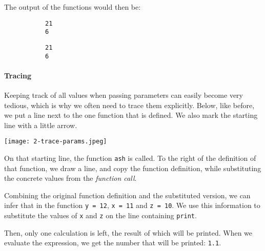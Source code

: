 The output of the functions would then be:

\begin{figure}[h]
\begin{subfigure}[b]{.5\linewidth}
\begin{verbatim}
21
6
\end{verbatim}
\end{subfigure}
\begin{subfigure}[b]{.5\linewidth}
\begin{verbatim}
21
6
\end{verbatim}
\end{subfigure}
\end{figure}

\paragraph{Tracing}

Keeping track of all values when passing parameters can easily become very tedious, which is why we often need to trace them explicitly. Below, like before, we put a line next to the one function that is defined. We also mark the starting line with a little arrow.

\texttt{[image: 2-trace-params.jpeg]}

On that starting line, the function \texttt{ash} is called. To the right of the definition of that function, we draw a line, and copy the function definition, while substituting the concrete values from the \emph{function call}.

Combining the original function definition and the substituted version, we can infer that in the function \texttt{y = 12}, \texttt{x = 11} and \texttt{z = 10}. We use this information to substitute the values of \texttt{x} and \texttt{z} on the line containing \texttt{print}.

Then, only one calculation is left, the result of which will be printed. When we evaluate the expression, we get the number that will be printed: \texttt{1.1}.
